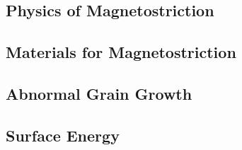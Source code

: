 \subsection{Physics of Magnetostriction}

\subsection{Materials for Magnetostriction}\label{magnetostrict-materials}


\subsection{Abnormal Grain Growth}\label{abnormal-grain-growth}



\subsection{Surface Energy}\label{surface-energy}


